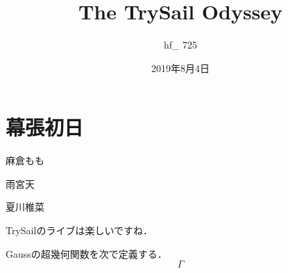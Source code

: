 \documentclass[uplatex]{jsarticle}
\title{The TrySail Odyssey}
\author{hf\_ 725}
\date{2019年8月4日}
\begin{document}
\maketitle
\section{幕張初日}
麻倉もも

雨宮天

夏川椎菜

\begin{definition}
TrySailのライブは楽しいですね．
\end{definition}

\begin{definition}
Gaussの超幾何関数を次で定義する．
\[ \Gamma \]
\end{definition}
\cite{Audin--Damian}

\nocite{*}

\end{document}
